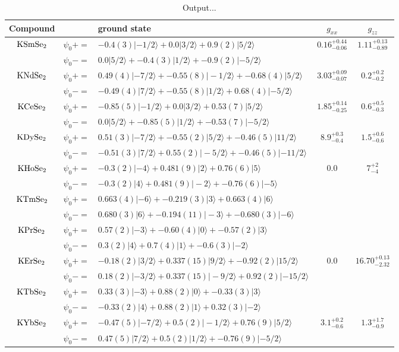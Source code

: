 \begin{table*}
\caption{Output...}
\begin{ruledtabular}
\begin{tabular}{c|rl|c|c}
Compound & & ground state & $g_{xx}$ & $g_{zz}$ \tabularnewline
 \hline 
$\rm KSmSe_2$ &$ \psi_0+ =$ &$ -0.4(3)|-1/2 \rangle + 0.0|3/2 \rangle + 0.9(2)|5/2 \rangle  $&$ 0.16^{+0.44}_{-0.06}  $&$ 1.11^{+0.13}_{-0.89}  $ \tabularnewline
 & $   \psi_0- =$ &$ 0.0|5/2 \rangle + -0.4(3)|1/2 \rangle + -0.9(2)|-5/2 \rangle $ & & \tabularnewline
$\rm KNdSe_2$ &$ \psi_0+ =$ &$ 0.49(4)|-7/2 \rangle + -0.55(8)|-1/2 \rangle + -0.68(4)|5/2 \rangle  $&$ 3.03^{+0.09}_{-0.07}  $&$ 0.2^{+0.2}_{-0.2}  $ \tabularnewline
 & $   \psi_0- =$ &$ -0.49(4)|7/2 \rangle + -0.55(8)|1/2 \rangle + 0.68(4)|-5/2 \rangle $ & & \tabularnewline
$\rm KCeSe_2$ &$ \psi_0+ =$ &$ -0.85(5)|-1/2 \rangle + 0.0|3/2 \rangle + 0.53(7)|5/2 \rangle  $&$ 1.85^{+0.14}_{-0.25}  $&$ 0.6^{+0.5}_{-0.3}  $ \tabularnewline
 & $   \psi_0- =$ &$ 0.0|5/2 \rangle + -0.85(5)|1/2 \rangle + -0.53(7)|-5/2 \rangle $ & & \tabularnewline
$\rm KDySe_2$ &$ \psi_0+ =$ &$ 0.51(3)|-7/2 \rangle + -0.55(2)|5/2 \rangle + -0.46(5)|11/2 \rangle  $&$ 8.9^{+0.3}_{-0.4}  $&$ 1.5^{+0.6}_{-0.6}  $ \tabularnewline
 & $   \psi_0- =$ &$ -0.51(3)|7/2 \rangle + 0.55(2)|-5/2 \rangle + -0.46(5)|-11/2 \rangle $ & & \tabularnewline
$\rm KHoSe_2$ &$ \psi_0+ =$ &$ -0.3(2)|-4 \rangle + 0.481(9)|2 \rangle + 0.76(6)|5 \rangle  $&$ 0.0  $&$ 7^{+2}_{-4}  $ \tabularnewline
 & $   \psi_0- =$ &$ -0.3(2)|4 \rangle + 0.481(9)|-2 \rangle + -0.76(6)|-5 \rangle $ & & \tabularnewline
$\rm KTmSe_2$ &$ \psi_0+ =$ &$ 0.663(4)|-6 \rangle + -0.219(3)|3 \rangle + 0.663(4)|6 \rangle  $&$  $&$   $ \tabularnewline
 & $   \psi_0- =$ &$ 0.680(3)|6 \rangle + -0.194(11)|-3 \rangle + -0.680(3)|-6 \rangle $ & & \tabularnewline
$\rm KPrSe_2$ &$ \psi_0+ =$ &$ 0.57(2)|-3 \rangle + -0.60(4)|0 \rangle + -0.57(2)|3 \rangle  $&$  $&$   $ \tabularnewline
 & $   \psi_0- =$ &$ 0.3(2)|4 \rangle + 0.7(4)|1 \rangle + -0.6(3)|-2 \rangle $ & & \tabularnewline
$\rm KErSe_2$ &$ \psi_0+ =$ &$ -0.18(2)|3/2 \rangle + 0.337(15)|9/2 \rangle + -0.92(2)|15/2 \rangle  $&$ 0.0  $&$ 16.70^{+0.13}_{-2.32}  $ \tabularnewline
 & $   \psi_0- =$ &$ 0.18(2)|-3/2 \rangle + 0.337(15)|-9/2 \rangle + 0.92(2)|-15/2 \rangle $ & & \tabularnewline
$\rm KTbSe_2$ &$ \psi_0+ =$ &$ 0.33(3)|-3 \rangle + 0.88(2)|0 \rangle + -0.33(3)|3 \rangle  $&$  $&$   $ \tabularnewline
 & $   \psi_0- =$ &$ -0.33(2)|4 \rangle + 0.88(2)|1 \rangle + 0.32(3)|-2 \rangle $ & & \tabularnewline
$\rm KYbSe_2$ &$ \psi_0+ =$ &$ -0.47(5)|-7/2 \rangle + 0.5(2)|-1/2 \rangle + 0.76(9)|5/2 \rangle  $&$ 3.1^{+0.2}_{-0.6}  $&$ 1.3^{+1.7}_{-0.9}  $ \tabularnewline
 & $   \psi_0- =$ &$ 0.47(5)|7/2 \rangle + 0.5(2)|1/2 \rangle + -0.76(9)|-5/2 \rangle $ & & \tabularnewline
\end{tabular}\end{ruledtabular}
\label{flo:Eigenvectors}
\end{table*}
